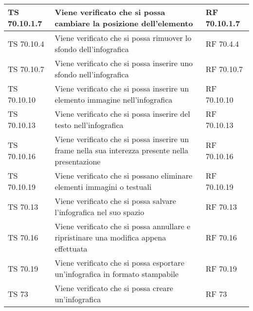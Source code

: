 {{\begin{longtable} [c]{| p{3cm} | p{6cm} |p{3cm}|}
			\hline
			TS 70.10.1.7 & Viene verificato che si possa cambiare la posizione dell'elemento & RF 70.10.1.7\\
			\hline
			TS 70.10.4 & Viene verificato che si possa rimuover lo sfondo dell'infografica\ped{g} & RF 70.4.4\\
			\hline
			TS 70.10.7 & Viene verificato che si possa inserire uno sfondo nell'infografica\ped{g} & RF 70.10.7\\
			\hline
			TS 70.10.10 & Viene verificato che si possa inserire un elemento immagine nell'infografica\ped{g} & RF 70.10.10\\
			\hline
			TS 70.10.13 & Viene verificato che si possa inserire del testo nell'infografica\ped{g} & RF 70.10.13\\
			\hline
			TS 70.10.16 & Viene verificato che si possa inserire un frame\ped{g} nella sua interezza presente nella presentazione & RF 70.10.16\\
			\hline
			TS 70.10.19 & Viene verificato che si possano eliminare elementi immagini o testuali & RF 70.10.19\\
			\hline
			TS 70.13 & Viene verificato che si possa salvare l'infografica\ped{g} nel suo spazio & RF 70.13\\
			\hline
			TS 70.16 & Viene verificato che si possa annullare e ripristinare una modifica appena effettuata & RF 70.16\\
			\hline
			TS 70.19 & Viene verificato che si possa esportare un'infografica\ped{g} in formato stampabile & RF 70.19\\
			\hline
			TS 73 & Viene verificato che si possa creare un'infografica\ped{g} & RF 73\\
			\hline
\end{longtable}
}
\newpage
}
